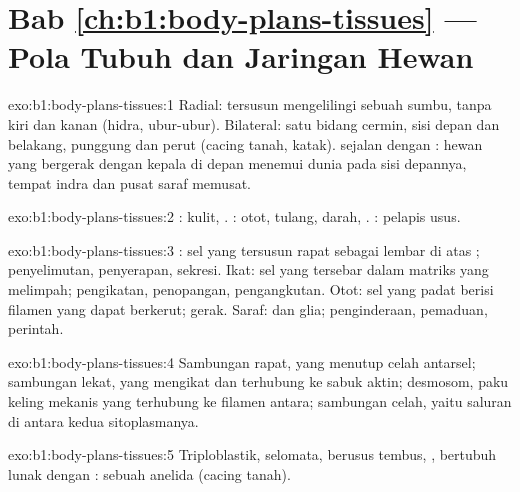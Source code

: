 \section*{Bab \ref{ch:b1:body-plans-tissues} --- Pola Tubuh dan Jaringan Hewan}

\begin{solution}{exo:b1:body-plans-tissues:1}
Radial: tersusun mengelilingi sebuah sumbu, tanpa kiri dan kanan
(hidra, ubur-ubur). Bilateral: satu bidang cermin, sisi depan dan
belakang, punggung dan perut (cacing tanah, katak).  sejalan
dengan : hewan yang bergerak dengan kepala di depan
menemui dunia pada sisi depannya, tempat indra dan pusat saraf memusat.
\end{solution}

\begin{solution}{exo:b1:body-plans-tissues:2}
:  kulit, . : otot, tulang,
darah, . : pelapis usus.
\end{solution}

\begin{solution}{exo:b1:body-plans-tissues:3}
: sel  yang tersusun rapat sebagai lembar di atas ; penyelimutan, penyerapan, sekresi. Ikat: sel yang tersebar dalam
matriks yang melimpah; pengikatan, penopangan, pengangkutan. Otot: sel
yang padat berisi filamen yang dapat berkerut; gerak. Saraf:  dan
glia; penginderaan, pemaduan, perintah.
\end{solution}

\begin{solution}{exo:b1:body-plans-tissues:4}
Sambungan rapat, yang menutup celah antarsel; sambungan lekat, yang
mengikat dan terhubung ke sabuk aktin; desmosom, paku keling mekanis
yang terhubung ke filamen antara; sambungan celah, yaitu saluran di
antara kedua sitoplasmanya.
\end{solution}

\begin{solution}{exo:b1:body-plans-tissues:5}
Triploblastik, selomata, berusus tembus, , bertubuh lunak
dengan : sebuah anelida (cacing tanah).
\end{solution}

